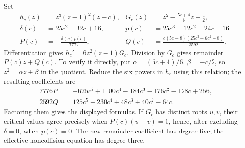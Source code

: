 Set
\begin{align*}
 h_c(z)&=z^3(z-1)^2(z-c),&
 G_c(z)&=z^2-\frac{5c+4}{6}z+\frac c2,\\
 \delta(c)&=25c^2-32c+16,&p(c)&=25c^3-12c^2-24c-16,\\
 P(c)&=-\frac{\delta(c)p(c)}{7776},&
 Q(c)&=\frac{c(5c-8)(25c^3-6c^2+8)}{2592}.
\end{align*}
Differentiation gives $h_c'=6z^2(z-1)G_c$. Division by $G_c$ gives
remainder $P(c)z+Q(c)$. To verify it directly, put
$\alpha=(5c+4)/6$, $\beta=-c/2$, so $z^2=\alpha z+\beta$
in the quotient. Reduce the six powers in $h_c$ using this relation;
the resulting coefficients are
\begin{align*}
 7776P&=-625c^5+1100c^4-184c^3-176c^2-128c+256,\\
 2592Q&=125c^5-230c^4+48c^3+40c^2-64c.
\end{align*}
Factoring them gives the displayed formulas. If $G_c$ has distinct
roots $u,v$, their critical values agree precisely when
$P(c)(u-v)=0$, hence, after excluding $\delta=0$, when $p(c)=0$.
The raw remainder coefficient has degree five; the effective
noncollision equation has degree three.

